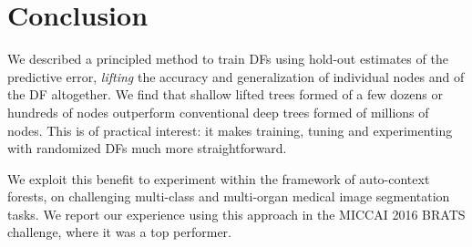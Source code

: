 
\section{Conclusion}
\label{sec:conc}

We described a principled method to train DFs using hold-out estimates of the predictive error, \textit{lifting} the accuracy and generalization of individual nodes and of the DF altogether. 
We find that shallow lifted trees formed of a few dozens or hundreds of nodes outperform conventional deep trees formed of millions of nodes. This is of practical interest: it makes training, tuning and experimenting with randomized 
DFs much more straightforward.

We exploit this benefit to experiment within the framework of auto-context forests, on challenging multi-class and multi-organ medical image segmentation tasks. We report our experience using this approach in the MICCAI 2016 BRATS 
challenge, where it was a top performer.


